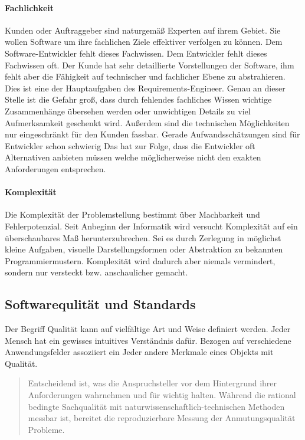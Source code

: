 \paragraph{Fachlichkeit}
Kunden oder Auftraggeber sind naturgemäß Experten auf ihrem Gebiet. Sie wollen Software um ihre fachlichen Ziele effektiver verfolgen zu können. Dem Software-Entwickler fehlt dieses Fachwissen. Dem Entwickler fehlt dieses Fachwissen oft.
Der Kunde hat sehr detaillierte Vorstellungen der Software, ihm fehlt aber die Fähigkeit auf technischer und fachlicher Ebene zu abstrahieren. Dies ist eine der Hauptaufgaben des Requirements-Engineer. Genau an dieser Stelle ist die Gefahr groß, dass durch fehlendes fachliches Wissen wichtige Zusammenhänge übersehen werden oder unwichtigen Details zu viel Aufmerksamkeit geschenkt wird.
Außerdem sind die technischen Möglichkeiten nur eingeschränkt für den Kunden fassbar. Gerade Aufwandsschätzungen sind für Entwickler schon schwierig Das hat zur Folge, dass die Entwickler oft Alternativen anbieten müssen welche möglicherweise nicht den exakten Anforderungen entsprechen.

\paragraph{Komplexität}
Die Komplexität der Problemstellung bestimmt über Machbarkeit und Fehlerpotenzial. Seit Anbeginn der Informatik wird versucht Komplexität auf ein überschaubares Maß herunterzubrechen. Sei es durch Zerlegung in möglichst kleine Aufgaben, visuelle Darstellungsformen oder Abstraktion zu bekannten Programmiermustern.
Komplexität wird dadurch aber niemals vermindert, sondern nur versteckt bzw. anschaulicher gemacht.


\subsection{Softwarequlität und Standards}
Der Begriff Qualität kann auf vielfältige Art und Weise definiert werden. Jeder Mensch hat ein gewisses intuitives Verständnis dafür. Bezogen auf verschiedene Anwendungsfelder assoziiert ein Jeder andere Merkmale eines Objekts mit Qualität.

\begin{quote}
Entscheidend ist, was die Anspruchsteller vor dem Hintergrund ihrer Anforderungen wahrnehmen und für wichtig halten. Während die rational bedingte Sachqualität mit naturwissenschaftlich-technischen Methoden messbar ist, bereitet die reproduzierbare Messung der Anmutungsqualität Probleme.\cite{markgraf_definition_2015}
\end{quote}

